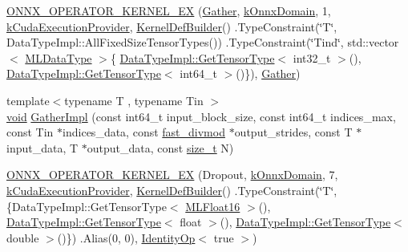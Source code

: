 \begin{DoxyCompactItemize}
\mbox{\hyperlink{namespaceonnxruntime_1_1cuda_a8a1b12ce4d3413ef590aec8e1a2d6d96}{O\+N\+N\+X\+\_\+\+O\+P\+E\+R\+A\+T\+O\+R\+\_\+\+K\+E\+R\+N\+E\+L\+\_\+\+EX}} (\mbox{\hyperlink{classonnxruntime_1_1cuda_1_1Gather}{Gather}}, \mbox{\hyperlink{namespaceonnxruntime_ac0e7c0c106a2c9e9594560a3ab289fa0}{k\+Onnx\+Domain}}, 1, \mbox{\hyperlink{namespaceonnxruntime_a73ebc64887ddd1968e3cef47ffefe35b}{k\+Cuda\+Execution\+Provider}}, \mbox{\hyperlink{classonnxruntime_1_1KernelDefBuilder}{Kernel\+Def\+Builder}}() .Type\+Constraint(\char`\"{}T\char`\"{}, Data\+Type\+Impl\+::\+All\+Fixed\+Size\+Tensor\+Types()) .Type\+Constraint(\char`\"{}Tind\char`\"{}, std\+::vector$<$ \mbox{\hyperlink{namespaceonnxruntime_ad77d0a6e838ec7da5dc35fed5ee66b49}{M\+L\+Data\+Type}} $>$\{ \mbox{\hyperlink{classonnxruntime_1_1DataTypeImpl_a7c4a6a7126bc7661eb67af6dfcfad1fb}{Data\+Type\+Impl\+::\+Get\+Tensor\+Type}}$<$ int32\+\_\+t $>$(), \mbox{\hyperlink{classonnxruntime_1_1DataTypeImpl_a7c4a6a7126bc7661eb67af6dfcfad1fb}{Data\+Type\+Impl\+::\+Get\+Tensor\+Type}}$<$ int64\+\_\+t $>$()\}), \mbox{\hyperlink{classonnxruntime_1_1cuda_1_1Gather}{Gather}})
\item 
{\footnotesize template$<$typename T , typename Tin $>$ }\\\mbox{\hyperlink{mlasi_8h_a88f941d423cb2a819b70a1358982b1a6}{void}} \mbox{\hyperlink{namespaceonnxruntime_1_1cuda_ad9a43f207dedf5127a48035b151b2727}{Gather\+Impl}} (const int64\+\_\+t input\+\_\+block\+\_\+size, const int64\+\_\+t indices\+\_\+max, const Tin $\ast$indices\+\_\+data, const \mbox{\hyperlink{classonnxruntime_1_1cuda_1_1fast__divmod}{fast\+\_\+divmod}} $\ast$output\+\_\+strides, const T $\ast$input\+\_\+data, T $\ast$output\+\_\+data, const \mbox{\hyperlink{mlasi_8h_a503efbc1c6e50825320ad909366b78ab}{size\+\_\+t}} N)
\item 
\mbox{\hyperlink{namespaceonnxruntime_1_1cuda_afd26e7de98f712950587ab163c42ce99}{O\+N\+N\+X\+\_\+\+O\+P\+E\+R\+A\+T\+O\+R\+\_\+\+K\+E\+R\+N\+E\+L\+\_\+\+EX}} (Dropout, \mbox{\hyperlink{namespaceonnxruntime_ac0e7c0c106a2c9e9594560a3ab289fa0}{k\+Onnx\+Domain}}, 7, \mbox{\hyperlink{namespaceonnxruntime_a73ebc64887ddd1968e3cef47ffefe35b}{k\+Cuda\+Execution\+Provider}}, \mbox{\hyperlink{classonnxruntime_1_1KernelDefBuilder}{Kernel\+Def\+Builder}}() .Type\+Constraint(\char`\"{}T\char`\"{}, \{Data\+Type\+Impl\+::\+Get\+Tensor\+Type$<$ \mbox{\hyperlink{uniononnxruntime_1_1MLFloat16}{M\+L\+Float16}} $>$(), \mbox{\hyperlink{classonnxruntime_1_1DataTypeImpl_a7c4a6a7126bc7661eb67af6dfcfad1fb}{Data\+Type\+Impl\+::\+Get\+Tensor\+Type}}$<$ float $>$(), \mbox{\hyperlink{classonnxruntime_1_1DataTypeImpl_a7c4a6a7126bc7661eb67af6dfcfad1fb}{Data\+Type\+Impl\+::\+Get\+Tensor\+Type}}$<$ double $>$()\}) .Alias(0, 0), \mbox{\hyperlink{classonnxruntime_1_1cuda_1_1IdentityOp}{Identity\+Op}}$<$ true $>$)

\end{DoxyCompactItemize}
